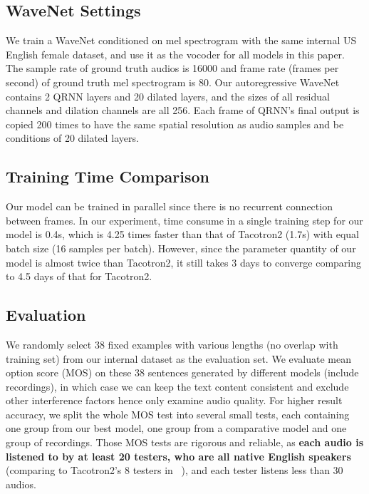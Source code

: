 \documentclass[letterpaper]{article} \usepackage{aaai19}  \usepackage{times}  \usepackage{helvet}  \usepackage{courier}  \usepackage{url}  \usepackage{graphicx}  \frenchspacing
\newcommand{\citet}[1]
{\citeauthor{#1}~\shortcite{#1}}
\begin{document}
\subsection{WaveNet Settings}

We train a WaveNet conditioned on mel spectrogram with the same internal US English female dataset, and use it as the vocoder for all models in this paper.
The sample rate of ground truth audios is 16000 and frame rate (frames per second) of ground truth mel spectrogram is 80.
Our autoregressive WaveNet contains 2 QRNN layers and 20 dilated layers, and the sizes of all residual channels and dilation channels are all 256. Each frame of QRNN's final output is copied 200 times to have the same spatial resolution as audio samples and be conditions of 20 dilated layers.

\subsection{Training Time Comparison}
Our model can be trained in parallel since there is no recurrent connection between frames. In our experiment, time consume in a single training step for our model is 0.4s, which is 4.25 times faster than that of Tacotron2 (1.7s) with equal batch size (16 samples per batch). However, since the parameter quantity of our model is almost twice than Tacotron2, it still takes 3 days to converge comparing to 4.5 days of that for Tacotron2.

\subsection{Evaluation}

We randomly select 38 fixed examples with various lengths (no overlap with training set) from our internal dataset as the evaluation set. We evaluate mean option score (MOS) on these 38 sentences generated by different models (include recordings), in which case we can keep the text content consistent and exclude other interference factors hence only examine audio quality.
For higher result accuracy, we split the whole MOS test into several small tests, each containing one group from our best model, one group from a comparative model and one group of recordings. Those MOS tests are rigorous and reliable, as \textbf{each audio is listened to by at least 20 testers, who are all native English speakers } (comparing to Tacotron2's 8 testers in \citet{shen2017natural}), and each tester listens less than 30 audios.
\end{document}
